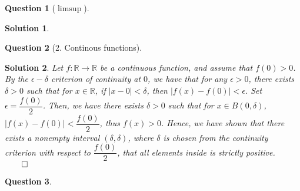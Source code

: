 \documentclass{article} %
\theoremstyle{quest}
\newtheorem*{question}{Question}
\newtheorem*{solution}{Solution}
\begin{document}
\bigskip

\begin{question}[$\limsup$]
\end{question}
\begin{solution}

\end{solution}


\begin{question}[2. Continous functions]
\end{question}
\begin{solution}
Let $f:\mathbb{R} \to \mathbb{R}$ be a continuous function, and assume that $f(0) > 0$. By the $\epsilon-\delta$
criterion of continuity at $0$, we have that for any $\epsilon > 0$, there exists $\delta > 0$ such that for $x \in 
\mathbb{R}$, if $|x - 0| < \delta$, then $|f(x) - f(0)| < \epsilon$. Set $\epsilon = \dfrac{f(0)}{2}$. Then, 
we have there exists $\delta > 0$ such that for $x \in B(0,\delta)$, $|f(x) - f(0)| < \dfrac{f(0)}{2}$, thus
$f(x) > 0$. Hence, we have shown that there exists a nonempty interval $(\delta, \delta)$, where $\delta$ is chosen
from the continuity criterion with respect to $\dfrac{f(0)}{2}$, that all elements inside is strictly positive.
$\qed$
\end{solution}

\begin{question}
\end{question}
\end{document}
